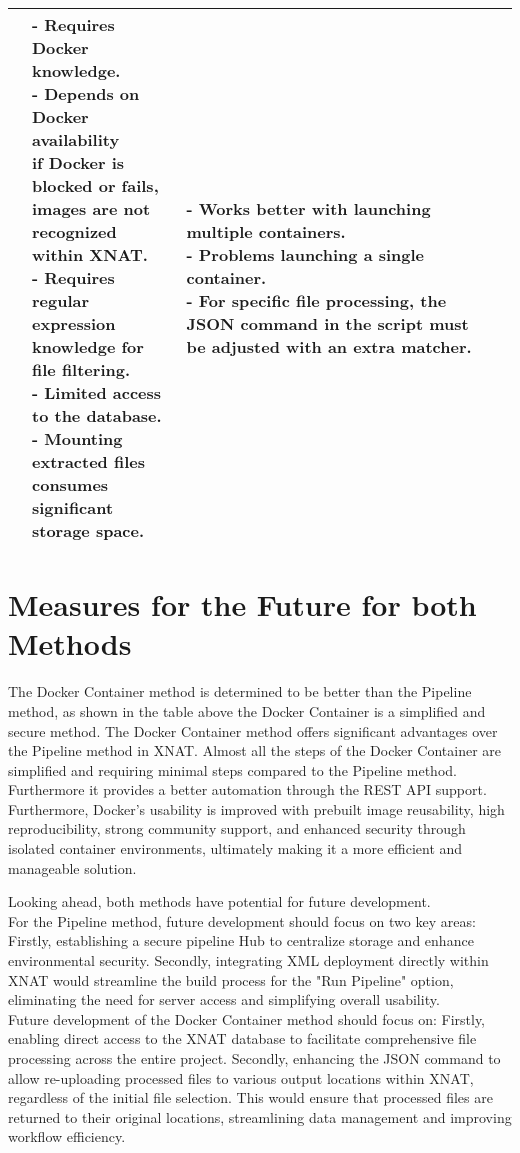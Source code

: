 \begin{table}[htbp]
\begin{tabular}{|p{3cm}|p{3cm}|p{5cm}|p{4cm}|}
{}
&
\parbox[t]{6cm}{
- Requires Docker knowledge. \\
- Depends on Docker availability \\if Docker is blocked or fails, \\images are not recognized\\ within XNAT. \\
- Requires regular expression\\ knowledge for file filtering. \\
- Limited access to the database. \\
- Mounting extracted files \\ consumes significant \\storage space.\\
}
&
\parbox[t]{4cm}{
- Works better with launching multiple containers. \\
- Problems launching a single container. \\
- For specific file processing, the JSON command in the script must be adjusted with an extra matcher.
} \\
\hline
\end{tabular}
\label{tab:docker_pipeline}
\end{table}


\section{Measures for the Future for both Methods}

The Docker Container method is determined to be better than the Pipeline method, as shown in the table above the Docker Container is a simplified and secure method.  
The Docker Container method offers significant advantages over the Pipeline method in XNAT.
Almost all the steps of the Docker Container are simplified and requiring minimal steps compared to the Pipeline method. Furthermore it provides a better automation through the REST API support.  Furthermore, Docker's usability is improved with prebuilt image reusability, high reproducibility, strong community support, and enhanced security through isolated container environments, ultimately making it a more efficient and manageable solution.

Looking ahead, both methods have potential for future development.\\
For the Pipeline method, future development should focus on two key areas: Firstly, establishing a secure pipeline Hub to centralize storage and enhance environmental security. Secondly, integrating XML deployment directly within XNAT would streamline the build process for the "Run Pipeline" option, eliminating the need for server access and simplifying overall usability.\\
Future development of the Docker Container method should focus on: Firstly, enabling direct access to the XNAT database to facilitate comprehensive file processing across the entire project. Secondly, enhancing the JSON command to allow re-uploading processed files to various output locations within XNAT, regardless of the initial file selection. This would ensure that processed files are returned to their original locations, streamlining data management and improving workflow efficiency.
